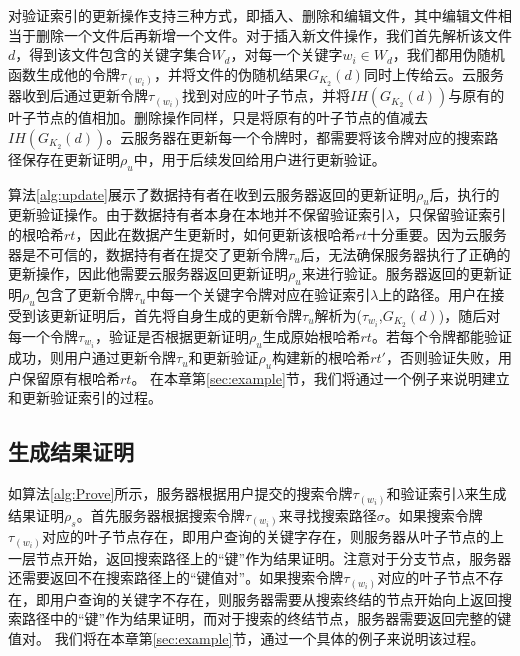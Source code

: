 对验证索引的更新操作支持三种方式，即插入、删除和编辑文件，其中编辑文件相当于删除一个文件后再新增一个文件。对于插入新文件操作，我们首先解析该文件$d$，得到该文件包含的关键字集合$W_d$，对每一个关键字$w_i \in W_d$，我们都用伪随机函数生成他的令牌$\tau_(w_i )$，并将文件的伪随机结果$G_{K_2}(d)$同时上传给云。云服务器收到后通过更新令牌$\tau_(w_i )$找到对应的叶子节点，并将$IH(G_{K_2}(d))$与原有的叶子节点的值相加。删除操作同样，只是将原有的叶子节点的值减去$IH(G_{K_2}(d))$。云服务器在更新每一个令牌时，都需要将该令牌对应的搜索路径保存在更新证明$\rho_u$中，用于后续发回给用户进行更新验证。


算法\ref{alg:update}展示了数据持有者在收到云服务器返回的更新证明$\rho_u$后，执行的更新验证操作。由于数据持有者本身在本地并不保留验证索引$\lambda$，只保留验证索引的根哈希$rt$，因此在数据产生更新时，如何更新该根哈希$rt$十分重要。因为云服务器是不可信的，数据持有者在提交了更新令牌$\tau_u$后，无法确保服务器执行了正确的更新操作，因此他需要云服务器返回更新证明$\rho_u$来进行验证。服务器返回的更新证明$\rho_u$包含了更新令牌$\tau_u$中每一个关键字令牌对应在验证索引$\lambda$上的路径。用户在接受到该更新证明后，首先将自身生成的更新令牌$\tau_u$解析为($\tau_{w_i}$,$G_{K_2}(d)$)，随后对每一个令牌$\tau_{w_i}$，验证是否根据更新证明$\rho_u$生成原始根哈希$rt$。若每个令牌都能验证成功，则用户通过更新令牌$\tau_u$和更新验证$\rho_u$构建新的根哈希$rt'$，否则验证失败，用户保留原有根哈希$rt$。
在本章第\ref{sec:example}节，我们将通过一个例子来说明建立和更新验证索引的过程。


\subsection{生成结果证明}
如算法\ref{alg:Prove}所示，服务器根据用户提交的搜索令牌$\tau_(w_i )$和验证索引$\lambda$来生成结果证明$\rho_s$。首先服务器根据搜索令牌$\tau_(w_i )$来寻找搜索路径$\sigma$。如果搜索令牌$\tau_(w_i )$对应的叶子节点存在，即用户查询的关键字存在，则服务器从叶子节点的上一层节点开始，返回搜索路径上的“键”作为结果证明。注意对于分支节点，服务器还需要返回不在搜索路径上的“键值对”。如果搜索令牌$\tau_(w_i)$对应的叶子节点不存在，即用户查询的关键字不存在，则服务器需要从搜索终结的节点开始向上返回搜索路径中的“键”作为结果证明，而对于搜索的终结节点，服务器需要返回完整的键值对。
我们将在本章第\ref{sec:example}节，通过一个具体的例子来说明该过程。

